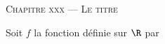 \documentclass[a4paper]{article}
\begin{document}
\begin{center}
  {\scshape\LARGE Chapitre xxx --- Le titre\par}
\end{center}
 
\begin{activite}{}{} 

\end{activite}


\begin{definition}{}{}
    Soit $f$ la fonction définie sur $\R$ par 
\end{definition}

\begin{propriete}{}{}  
\end{propriete}

\begin{exercices}{}{}
\end{exercices}


  
\end{document}
